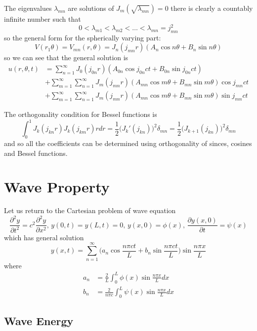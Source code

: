\documentclass[a4paper]{article}
\begin{document}
The eigenvalues \(\lambda_{mn}\) are solutions of \(J_m(\sqrt{\lambda_{mn}})=0\) there is clearly a countably infinite number such that
\[
  0 < \lambda_{m1} < \lambda_{m2} < \dots < \lambda_{mn} = j_{mn}^2
\]
so the general form for the spherically varying part:
\[
  V(r_1\theta) = V_{mn}(r,\theta) = J_n(j_{mn}r) (A_n\cos n\theta + B_n \sin n\theta)
\]
so we can see that the general solution is
\begin{align*}
  u(r,\theta,t) &= \sum_{n=1}^{\infty}J_0(j_{0n}r) (A_{0n}\cos j_{0n}ct + B_{0n}\sin j_{0n}ct) \\
                &+ \sum_{m=1}^{\infty} \sum_{n=1}^{\infty} J_m(j_{mn}r) (A_{mn}\cos m\theta + B_{mn} \sin m\theta ) \cos j_{mn}ct \\
                &+ \sum_{m=1}^{\infty} \sum_{n=1}^{\infty}J_m(j_{mn}r) (A_{mn}\cos m\theta + B_{mn} \sin m\theta ) \sin j_{mn}ct
\end{align*}

The orthogonality condition for Bessel functions is
\[
  \int_{0}^{1} J_k(j_{kn}r)J_k(j_{km}r)r dr = \frac{1}{2} \big(J_k'(j_{kn}) \big)^2 \delta_{mn} = \frac{1}{2} \big( J_{k+1}(j_{kn}) \big)^2 \delta_{mn}
\]
and so all the coefficients can be determined using orthogonality of sinces, cosines and Bessel functions.

\section{Wave Property}

Let us return to the Cartesian problem of wave equation
\[
  \frac{\partial^2 y}{\partial t^2} = c^2 \frac{\partial^2 y}{\partial x^2}, \, y(0,t) = y(L,t) = 0, \, y(x,0) = \phi(x), \, \frac{\partial y(x,0)}{\partial t} = \psi(x)
\]
which has general solution
\[
  y(x,t) = \sum_{n=1}^{\infty} \Big( a_n \cos \frac{n\pi ct}{L} + b_n \sin \frac{n\pi ct}{L} \Big) \sin \frac{n\pi x}{L}
\]
where
\begin{align*}
  a_n &= \frac{2}{L} \int_{0}^{L} \phi(x)\sin\frac{n\pi x}{L} dx \\
  b_n &= \frac{2}{n\pi c} \int_{0}^{L} \psi(x)\sin \frac{n\pi x}{L} dx
\end{align*}

\subsection{Wave Energy}
\end{document}
